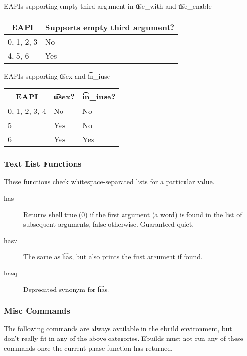 \begin{centertable}{EAPIs supporting empty third argument in \t{use\_with} and \t{use\_enable}}
    \label{tab:use-with-third-arg}
    \begin{tabular}{ll}
      \toprule
      \multicolumn{1}{c}{\textbf{EAPI}} &
      \multicolumn{1}{c}{\textbf{Supports empty third argument?}} \\
      \midrule
      0, 1, 2, 3        & No  \\
      4, 5, 6           & Yes \\
      \bottomrule
    \end{tabular}
\end{centertable}

\begin{centertable}{EAPIs supporting \t{usex} and \t{in\_iuse}}
    \label{tab:use-list-functions}
    \begin{tabular}{lll}
      \toprule
      \multicolumn{1}{c}{\textbf{EAPI}} &
      \multicolumn{1}{c}{\textbf{\t{usex}?}} &
      \multicolumn{1}{c}{\textbf{\t{in\_iuse}?}} \\
      \midrule
      0, 1, 2, 3, 4     & No  & No  \\
      5                 & Yes & No  \\
      6                 & Yes & Yes \\
      \bottomrule
    \end{tabular}
\end{centertable}

\subsubsection{Text List Functions}
These functions check whitespace-separated lists for a particular value.

\begin{description}
\item[has] Returns shell true (0) if the first argument (a word) is found in the list of subsequent
    arguments, false otherwise. Guaranteed quiet.
\item[hasv] The same as \t{has}, but also prints the first argument if found.
\item[hasq] Deprecated synonym for \t{has}.
\end{description}

\subsubsection{Misc Commands}
The following commands are always available in the ebuild environment, but don't really fit in any
of the above categories. Ebuilds must not run any of these commands once the current phase function
has returned.

